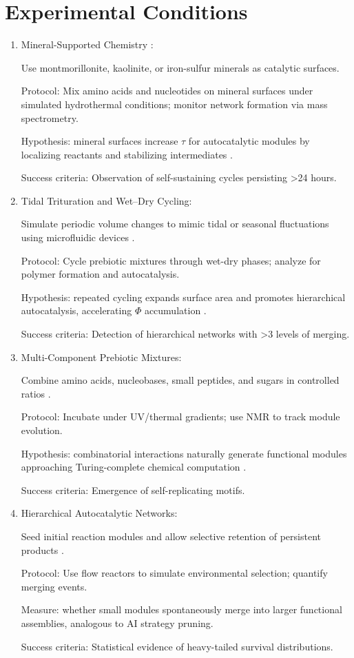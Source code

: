 \documentclass{book}
\begin{document}
\section{Experimental Conditions}
\begin{enumerate}
\item Mineral-Supported Chemistry \citep{hazen2005}:

Use montmorillonite, kaolinite, or iron-sulfur minerals as catalytic surfaces.

Protocol: Mix amino acids and nucleotides on mineral surfaces under simulated hydrothermal conditions; monitor network formation via mass spectrometry.

Hypothesis: mineral surfaces increase $\tau$ for autocatalytic modules by localizing reactants and stabilizing intermediates \citep{adam2012}.

Success criteria: Observation of self-sustaining cycles persisting >24 hours.

\item Tidal Trituration and Wet–Dry Cycling:

Simulate periodic volume changes to mimic tidal or seasonal fluctuations using microfluidic devices \citep{matreux2024}.

Protocol: Cycle prebiotic mixtures through wet-dry phases; analyze for polymer formation and autocatalysis.

Hypothesis: repeated cycling expands surface area and promotes hierarchical autocatalysis, accelerating $\Phi$ accumulation \citep{toppozada2021}.

Success criteria: Detection of hierarchical networks with >3 levels of merging.

\item Multi-Component Prebiotic Mixtures:

Combine amino acids, nucleobases, small peptides, and sugars in controlled ratios \citep{stubbs2020}.

Protocol: Incubate under UV/thermal gradients; use NMR to track module evolution.

Hypothesis: combinatorial interactions naturally generate functional modules approaching Turing-complete chemical computation \citep{bao2022}.

Success criteria: Emergence of self-replicating motifs.

\item Hierarchical Autocatalytic Networks:

Seed initial reaction modules and allow selective retention of persistent products \citep{sokolskyi2024}.

Protocol: Use flow reactors to simulate environmental selection; quantify merging events.

Measure: whether small modules spontaneously merge into larger functional assemblies, analogous to AI strategy pruning.

Success criteria: Statistical evidence of heavy-tailed survival distributions.
\end{enumerate}
\end{document}
